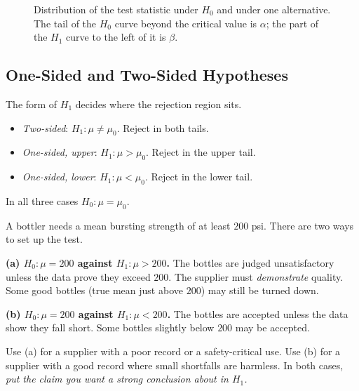 \begin{figure}[h]
\centering
{}
\caption{Distribution of the test statistic under $H_0$ and under one alternative. The tail of the $H_0$ curve beyond the critical value is $\alpha$; the part of the $H_1$ curve to the left of it is $\beta$.}
\end{figure}


\subsection{One-Sided and Two-Sided Hypotheses}

The form of $H_1$ decides where the rejection region sits.

\begin{definition}
\begin{itemize}
  \item \emph{Two-sided}: $H_1:\mu\ne\mu_0$. Reject in both tails.
  \item \emph{One-sided, upper}: $H_1:\mu>\mu_0$. Reject in the upper tail.
  \item \emph{One-sided, lower}: $H_1:\mu<\mu_0$. Reject in the lower tail.
\end{itemize}
In all three cases $H_0:\mu=\mu_0$.
\end{definition}

\begin{example}
A bottler needs a mean bursting strength of at least $200$ psi. There are two ways to set up the test.

\textbf{(a) $H_0:\mu=200$ against $H_1:\mu>200$.} The bottles are judged unsatisfactory unless the data prove they exceed $200$. The supplier must \emph{demonstrate} quality. Some good bottles (true mean just above $200$) may still be turned down.

\textbf{(b) $H_0:\mu=200$ against $H_1:\mu<200$.} The bottles are accepted unless the data show they fall short. Some bottles slightly below $200$ may be accepted.

Use (a) for a supplier with a poor record or a safety-critical use. Use (b) for a supplier with a good record where small shortfalls are harmless. In both cases, \emph{put the claim you want a strong conclusion about in $H_1$.}
\end{example}


